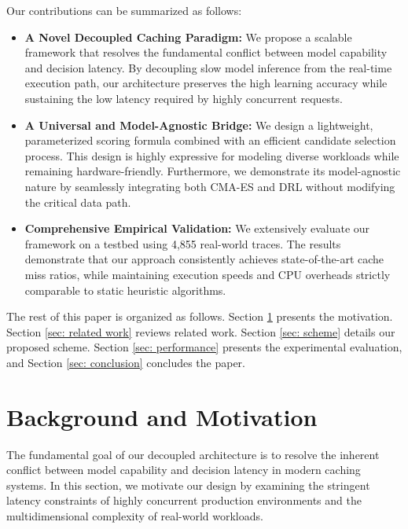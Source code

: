 \documentclass[10pt,journal]{IEEEtran}
\theoremstyle{slantedlemma}
\begin{document}
Our contributions can be summarized as follows:
\begin{itemize}
	\item \textbf{A Novel Decoupled Caching Paradigm:} We propose a scalable framework that resolves the fundamental conflict between model capability and decision latency. By decoupling slow model inference from the real-time execution path, our architecture preserves the high learning accuracy while sustaining the low latency required by highly concurrent requests.
    \item \textbf{A Universal and Model-Agnostic Bridge:} We design a lightweight, parameterized scoring formula combined with an efficient candidate selection process. This design is highly expressive for modeling diverse workloads while remaining hardware-friendly. Furthermore, we demonstrate its model-agnostic nature by seamlessly integrating both CMA-ES and DRL without modifying the critical data path.
    \item \textbf{Comprehensive Empirical Validation:} We extensively evaluate our framework on a testbed using 4,855 real-world traces. The results demonstrate that our approach consistently achieves state-of-the-art cache miss ratios, while maintaining execution speeds and CPU overheads strictly comparable to static heuristic algorithms.
\end{itemize}

The rest of this paper is organized as follows. Section \ref{sec: motivation} presents the motivation. Section \ref{sec: related work} reviews related work. Section \ref{sec: scheme} details our proposed scheme. Section \ref{sec: performance} presents the experimental evaluation, and Section \ref{sec: conclusion} concludes the paper.

\section{Background and Motivation}\label{sec: motivation}


The fundamental goal of our decoupled architecture is to resolve the inherent conflict between model capability and decision latency in modern caching systems. In this section, we motivate our design by examining the stringent latency constraints of highly concurrent production environments and the multidimensional complexity of real-world workloads.
\end{document}
